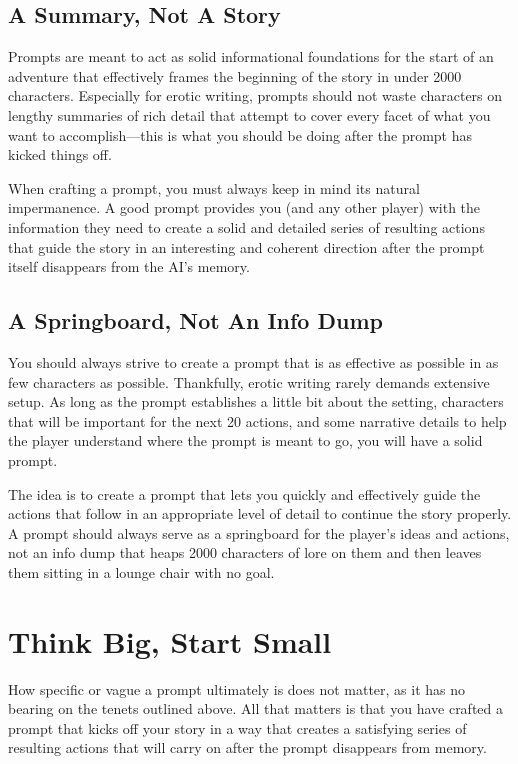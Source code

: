 ﻿\documentclass[Coomer-main.tex]{subfiles}
\begin{document}
\subsection{A Summary, Not A Story}

Prompts are meant to act as solid informational foundations for the start of an adventure that effectively frames the beginning of the story in under 2000 characters.
Especially for erotic writing, prompts should not waste characters on lengthy summaries of rich detail that attempt to cover every facet of what you want to accomplish—this is what you should be doing after the prompt has kicked things off.

When crafting a prompt, you must always keep in mind its natural impermanence.
A good prompt provides you (and any other player) with the information they need to create a solid and detailed series of resulting actions that guide the story in an interesting and coherent direction after the prompt itself disappears from the AI's memory.

\subsection{A Springboard, Not An Info Dump}

You should always strive to create a prompt that is as effective as possible in as few characters as possible.
Thankfully, erotic writing rarely demands extensive setup.
As long as the prompt establishes a little bit about the setting, characters that will be important for the next 20 actions, and some narrative details to help the player understand where the prompt is meant to go, you will have a solid prompt.

The idea is to create a prompt that lets you quickly and effectively guide the actions that follow in an appropriate level of detail to continue the story properly.
A prompt should always serve as a springboard for the player's ideas and actions, not an info dump that heaps 2000 characters of lore on them and then leaves them sitting in a lounge chair with no goal.

\section{Think Big, Start Small}

How specific or vague a prompt ultimately is does not matter, as it has no bearing on the tenets outlined above.
All that matters is that you have crafted a prompt that kicks off your story in a way that creates a satisfying series of resulting actions that will carry on after the prompt disappears from memory.
\end{document}
